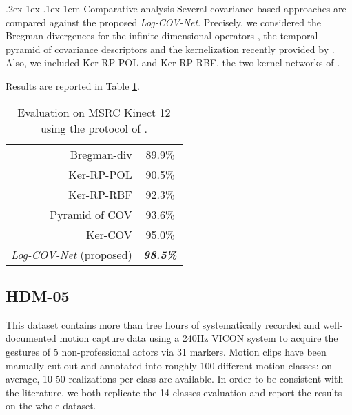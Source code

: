 \documentclass[10pt,twocolumn]{article}
\makeatletter
\renewcommand{\paragraph}{%
	\@startsection{paragraph}{4}%
	{\z@}{.2ex \@plus 1ex \@minus .1ex}{-1em}%
	{\normalfont\normalsize\bfseries}%
}
\makeatother
\begin{document}
\paragraph{Comparative analysis} Several covariance-based approaches are compared against the proposed \textit{Log-COV-Net}. Precisely, we considered the Bregman divergences for the infinite dimensional operators \cite{Harandi:CVPR14},  the temporal pyramid of covariance descriptors \cite{egizi} and the kernelization recently provided by \cite{Cavazza:ICPR16}. Also, we included Ker-RP-POL and Ker-RP-RBF, the two kernel networks of \cite{Wang:ICCV15}.

Results are reported in Table \ref{tab:MS}.

\begin{table}[h!]
	\centering
	\begin{tabular}{|rc|}
	\hline
	Bregman-div \cite{Harandi:CVPR14} & 89.9\%   \\
	Ker-RP-POL \cite{Wang:ICCV15} & 90.5\%  \\
	Ker-RP-RBF \cite{Wang:ICCV15} & 92.3\%  \\
	Pyramid of COV \cite{egizi} & 93.6\% \\
	Ker-COV \cite{Cavazza:ICPR16} & 95.0\% \\ \hline \hline
	\textit{Log-COV-Net} (proposed) & \textbf{\textit{98.5\%}} \\ \hline
\end{tabular}\vspace{5pt}
	\caption{Evaluation on MSRC Kinect 12 using the protocol of \cite{egizi}.}
\label{tab:MS}
\end{table}

\subsection{HDM-05}

This dataset contains more than tree hours of systematically recorded and well-documented motion capture data using a 240Hz VICON system to acquire the gestures of 5 non-professional actors via 31 markers. Motion clips have been manually cut out and annotated into roughly 100 different motion classes: on average, 10-50 realizations per class are available. In order to be consistent with the literature, we both replicate the 14 classes evaluation \cite{Wang:ICCV15,Cavazza:ICPR16} and report the results on the whole dataset.
\end{document}
